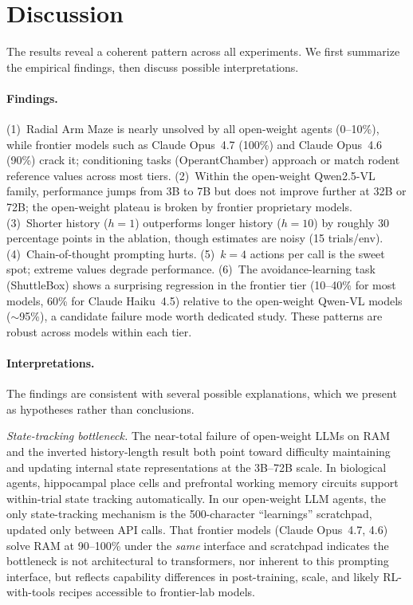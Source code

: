 \documentclass[letterpaper]{article}
\begin{document}
\section{Discussion}

The results reveal a coherent pattern across all experiments.
We first summarize the empirical findings, then discuss possible interpretations.

\paragraph{Findings.}
(1)~Radial Arm Maze is nearly unsolved by all open-weight agents (0--10\%), while frontier models such as Claude Opus~4.7 (100\%) and Claude Opus~4.6 (90\%) crack it; conditioning tasks (OperantChamber) approach or match rodent reference values across most tiers.
(2)~Within the open-weight Qwen2.5-VL family, performance jumps from 3B to 7B but does not improve further at 32B or 72B; the open-weight plateau is broken by frontier proprietary models.
(3)~Shorter history ($h{=}1$) outperforms longer history ($h{=}10$) by roughly 30 percentage points in the ablation, though estimates are noisy (15 trials/env).
(4)~Chain-of-thought prompting hurts.
(5)~$k{=}4$ actions per call is the sweet spot; extreme values degrade performance.
(6)~The avoidance-learning task (ShuttleBox) shows a surprising regression in the frontier tier (10--40\% for most models, 60\% for Claude Haiku~4.5) relative to the open-weight Qwen-VL models ($\sim$95\%), a candidate failure mode worth dedicated study.
These patterns are robust across models within each tier.

\paragraph{Interpretations.}
The findings are consistent with several possible explanations, which we present as hypotheses rather than conclusions.

\emph{State-tracking bottleneck.}
The near-total failure of open-weight LLMs on RAM and the inverted history-length result both point toward difficulty maintaining and updating internal state representations at the 3B--72B scale.
In biological agents, hippocampal place cells and prefrontal working memory circuits support within-trial state tracking automatically.
In our open-weight LLM agents, the only state-tracking mechanism is the 500-character ``learnings'' scratchpad, updated only between API calls.
That frontier models (Claude Opus~4.7, 4.6) solve RAM at 90--100\% under the \emph{same} interface and scratchpad indicates the bottleneck is not architectural to transformers, nor inherent to this prompting interface, but reflects capability differences in post-training, scale, and likely RL-with-tools recipes accessible to frontier-lab models.
\end{document}
